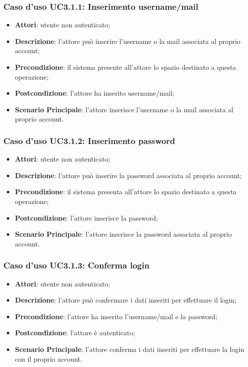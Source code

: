 \subsubsection{Caso d'uso UC3.1.1: Inserimento username/mail}
\begin{itemize}
	\item \textbf{Attori}: utente non autenticato;
	\item \textbf{Descrizione}: l'attore può inserire l'username o la mail associata al proprio account;
	\item \textbf{Precondizione}: il sistema presente all'attore lo spazio destinato a questa operazione;
	\item \textbf{Postcondizione}: l'attore ha inserito username/mail;
	\item \textbf{Scenario Principale}: l'attore inserisce l'username o la mail associata al proprio account. 
\end{itemize}

\subsubsection{Caso d'uso UC3.1.2: Inserimento password}
\begin{itemize}
	\item \textbf{Attori}: utente non autenticato;
	\item \textbf{Descrizione}: l'attore può inserire la password associata al proprio account;
	\item \textbf{Precondizione}: il sistema presenta all'attore lo spazio destinato a questa operazione;
	\item \textbf{Postcondizione}: l'attore inserisce la password;
	\item \textbf{Scenario Principale}: l'attore inserisce la password associata al proprio account.
\end{itemize}

\subsubsection{Caso d'uso UC3.1.3: Conferma login}
\begin{itemize}
	\item \textbf{Attori}: utente non autenticato;
	\item \textbf{Descrizione}: l'attore può confermare i dati inseriti per effettuare il login;
	\item \textbf{Precondizione}: l'attore ha inserito l'username/mail e la password;
	\item \textbf{Postcondizione}: l'attore è autenticato;
	\item \textbf{Scenario Principale}: l'attore conferma i dati inseriti per effettuare la login con il proprio account.
\end{itemize}

